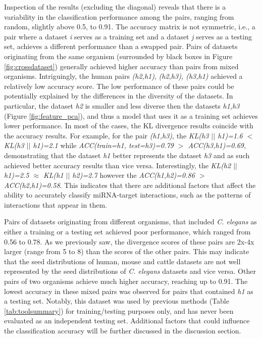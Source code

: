 Inspection of the results (excluding the diagonal) reveals that there is a variability in the classification performance among the pairs, ranging from random, slightly above 0.5, to 0.91. The accuracy matrix is not symmetric, i.e., a pair where a dataset \textit{i} serves as a training set and a dataset \textit{j} serves as a testing set, achieves a different performance than a swapped pair. Pairs of datasets originating from the same organism (surrounded by black boxes in Figure \ref{fig:crossdataset}) generally achieved higher accuracy than pairs from mixed organisms. Intriguingly, the human pairs \textit{(h2,h1)}, \textit{(h2,h3), \textit{(h3,h1)}} achieved a relatively low accuracy score. The low performance of these pairs could be potentially explained by the differences in the diversity of the datasets. In particular, the dataset \textit{h2} is smaller and less diverse then the datasets \textit{h1,h3} (Figure \ref{fig:feature_pca}), and thus a model that uses it as a training set achieves lower performance. In most of the cases, the KL divergence results coincide with the accuracy results. For example, for the pair \textit{(h1,h3)}, the \textit{KL(h3 $||$ h1)=1.6 $<$ KL(h3 $||$ h1)=2.1} while \textit{ACC(train=h1, test=h3)=0.79 $>$ ACC(h3,h1)=0.69}, demonstrating that the dataset \textit{h1} better represents the dataset \textit{h3} and as such achieved better accuracy results than vice versa. Interestingly, the \textit{KL(h2 $||$ h1)=2.5 $\approx$ KL(h1 $||$ h2)=2.7} however the \textit{ACC(h1,h2)=0.86 $>$ ACC(h2,h1)=0.58}. This indicates that there are additional factors that affect the ability to accurately classify miRNA-target interactions, such as the patterns of interactions that appear in them.

Pairs of datasets originating from different organisms, that included \textit{C. elegans} as either a training or a testing set achieved poor performance, which ranged from 0.56 to 0.78. As we previously saw, the divergence scores of these pairs are 2x-4x larger (range from 5 to 8) than the scores of the other pairs. This may indicate that the seed distributions of human, mouse and cattle datasets are not well represented by the seed distributions of \textit{C. elegans} datasets and vice versa. Other pairs of two organisms achieve much higher accuracy, reaching up to 0.91. The lowest accuracy in these mixed pairs was observed for pairs that contained \textit{h1} as a testing set. Notably, this dataset was used by previous methods (Table \ref{tab:toolsummary}) for training/testing purposes only, and has never been evaluated as an independent testing set. Additional factors that could influence the classification accuracy will be further discussed in the discussion section.

